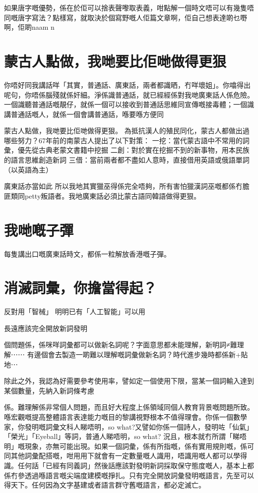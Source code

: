 \documentclass[a5paper, 10pt, openany]{book} %
\begin{document}
如果唐字嘅優勢，係在於佢可以捨表聲嚟取表義，咁點解一個時文唔可以有幾隻唔同嘅唐字寫法？點樣寫，就取決於個寫野嘅人佢篇文章啊，佢自己想表達啲乜嘢啊，佢啲naam n


\chapter{蒙古人點做，我哋要比佢哋做得更狠}
你唔好同我講話咩「其實，普通話、廣東話，兩者都識晒，冇咩壞姐」。你噏得出呢句，你唔係腦殘就係奸細。淨係識普通話，就已經經係對我哋廣東話人係危險。一個識聽普通話嘅靚仔，就係一個可以接收到普通話思維同宣傳嘅接毒體；一個識講普通話嘅人，就係一個會講普通話，喺要喺方便同


蒙古人點做，我哋要比佢哋做得更狠。
為抵抗漢人的殖民同化，蒙古人都做出過哪些努力？67年前的南蒙古人提出了以下對策：
一挖：當代蒙古語中不常用的詞彙，優先從古典老蒙文書籍中挖掘
二創：對於實在挖掘不到的新事物，用本民族的語言思維創造新詞
三借：當前兩者都不盡如人意時，直接借用英語或俄語單詞（以英語為主）

廣東話亦當如此
所以我地其實獵巫得係完全唔夠，所有害怕獵漢詞巫嘅都係冇膽匪類同petty叛語者。我地廣東話必須比蒙古語同韓語做得更狠。

\chapter{我哋嘅子彈}
每隻講出口嘅廣東話時文，都係一粒解放香港嘅子彈。

\chapter{消滅詞彙，你擔當得起？}
反對用「智械」
明明已有「人工智能」可以用

長遠應該完全開放新詞發明

個問題係，係咪咩詞彙都可以做新名詞呢？字面意思都未能理解，新明詞≠難理解⋯⋯ 有邊個會去製造一啲難以理解嘅詞彙做新名詞？時代進步幾時都係新+貼地⋯

除此之外，我認為好需要參考使用率，譬如定一個使用下限，當某一個詞輸入達到某個數量，先納入新詞條考慮


係。難理解係非常個人問題，而且好大程度上係領域同個人教育背景嘅問題所致。喺宏觀嘅提高整體語言表達能力嘅目的黎講視野根本不值得理會。你係一個數學家，你發明嘅詞彙文科人睇唔明，so what?又譬如你係一個詩人，發明咗「仙氣」「榮光」「Eyeball」等詞，普通人睇唔明，so what? 況且，根本就冇所謂「睇唔明」嘅現象，亦無可能出現。如果一個詞彙，係有所指嘅，係有實用規則嘅，係可同其他詞彙配搭嘅，咁用用下就會有一定數量嘅人識用，唔識用嘅人都可以學得識。任何話「已經有同義詞」然後話應該對發明新詞採取保守態度嘅人，基本上都係冇參透過喺語言嘅尖端度建模嘅掙扎。只有完全開放詞彙發明嘅語言，先至可以得天下。任何因為文字基建或者語言群守舊嘅語言，都必定滅亡。
\end{document}
